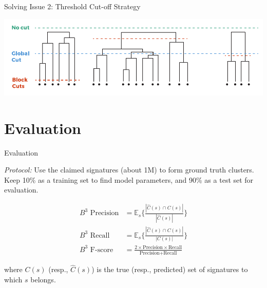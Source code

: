 \documentclass{beamer}
\begin{document}
\begin{frame} {Solving Issue 2: Threshold Cut-off Strategy}

\includegraphics[width=\textwidth]{./figures/fig-cuts.pdf}





\end{frame}



\section{Evaluation}

\begin{frame}{Evaluation}

{\it Protocol:} Use the {\color{blue} claimed signatures} (about 1M) to form {\color{blue} ground truth clusters}. Keep 10\% as a training set to find model parameters, and 90\% as a test set for evaluation.

\begin{align}
\text{$B^3$ Precision} &= \mathbb{E}_s \{ \frac{|\hat{C}(s) \cap C(s)|}{|\hat{C}(s)|}  \} \\
\text{$B^3$ Recall} &= \mathbb{E}_s \{ \frac{|\hat{C}(s) \cap C(s)|}{|C(s)|}  \} \\
\text{$B^3$ F-score} &= \frac{2 \times \text{Precision} \times \text{Recall}}{\text{Precision} + \text{Recall}}
\end{align}

where $C(s)$ (resp., $\hat{C}(s)$) is the true (resp., predicted) set of signatures to which $s$ belongs.




\end{frame}
\end{document}
